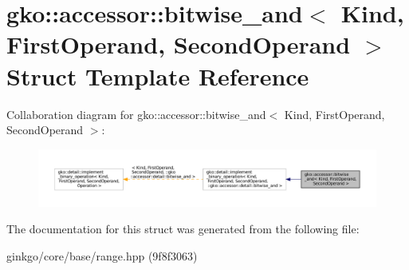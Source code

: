 \hypertarget{structgko_1_1accessor_1_1bitwise__and}{}\section{gko\+:\+:accessor\+:\+:bitwise\+\_\+and$<$ Kind, First\+Operand, Second\+Operand $>$ Struct Template Reference}
\label{structgko_1_1accessor_1_1bitwise__and}


Collaboration diagram for gko\+:\+:accessor\+:\+:bitwise\+\_\+and$<$ Kind, First\+Operand, Second\+Operand $>$\+:
\nopagebreak
\begin{figure}[H]
\begin{center}
\leavevmode
\includegraphics[width=350pt]{structgko_1_1accessor_1_1bitwise__and__coll__graph}
\end{center}
\end{figure}


The documentation for this struct was generated from the following file\+:\begin{DoxyCompactItemize}
\item 
ginkgo/core/base/range.\+hpp (9f8f3063)\end{DoxyCompactItemize}
